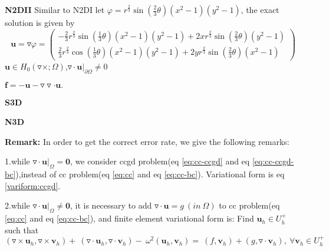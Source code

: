 \documentclass[a4paper,11pt]{article}
\begin{document}
\textbf{N2DII} Similar to N2DI let $\varphi = r^{\frac{2}{3}}\sin(\frac{2}{3}\theta)(x^2 - 1)(y^2 - 1)$, the exact solution is given by
\begin{equation}
\mathbf{u} = \triangledown\varphi = \left(\begin{array}{c}
-\frac{2}{3}r^{\frac{2}{3}}\sin(\frac{1}{3}\theta)(x^2 - 1)(y^2 - 1) + 2x r^{\frac{2}{3}}\sin(\frac{2}{3}\theta)(y^2 - 1) \\
\frac{2}{3}r^{\frac{2}{3}}\cos(\frac{1}{3}\theta)(x^2 - 1)(y^2 - 1) + 2y r^{\frac{2}{3}}\sin(\frac{2}{3}\theta)(x^2 - 1)
\end{array}\right)
\end{equation}
\indent\indent\indent\indent\indent\indent\indent\indent$\mathbf{u}\in H_0(\triangledown\times;\Omega)$,$\triangledown\cdot\mathbf{u}|_{\partial\Omega} \neq 0$

\indent\indent\indent\indent\indent\indent\indent\indent$\mathbf{f} = -\mathbf{u} - \triangledown\triangledown\cdot\mathbf{u}.$

\textbf{S3D}

\textbf{N3D}

\textbf{Remark:} In order to get the correct error rate, we give the following remarks:

1.while $\triangledown\cdot\mathbf{u}|_{\Omega}=\mathbf{0}$, we consider ccgd problem(eq \ref{eq:cc-ccgd} and eq \ref{eq:cc-ccgd-bc}),instead of cc problem(eq \ref{eq:cc} and eq \ref{eq:cc-bc}). Variational form is eq \ref{variform:ccgd}.

2.while $\triangledown\cdot\mathbf{u}|_{\Omega}\neq\mathbf{0}$, it is necessary to add $\triangledown\cdot\mathbf{u} = g\ (in\ \Omega )$ to cc problem(eq \ref{eq:cc} and eq \ref{eq:cc-bc}), and finite element variational form is: Find $\mathbf{u}_h\in U_{h}^{+}$ such that
\begin{equation}\label{eq:cc_div_neq_0}
(\triangledown\times\mathbf{u}_h,\triangledown\times\mathbf{v}_h) + \
(\triangledown\cdot\mathbf{u}_h,\triangledown\cdot\mathbf{v}_h) -\
\omega^2(\mathbf{u}_h,\mathbf{v}_h) = \
(f,\mathbf{v}_h) + (g,\triangledown\cdot\mathbf{v}_h),\ \forall\mathbf{v}_h\in U_{h}^{+}
\end{equation}
\end{document}
